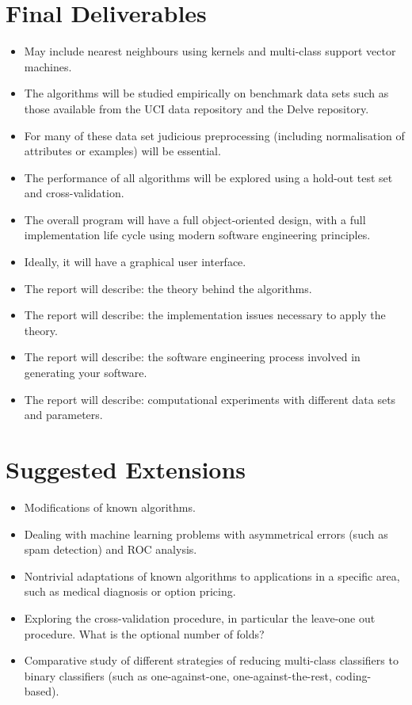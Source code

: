 \documentclass[]{final_report}
\begin{document}
\section{Final Deliverables}
\begin{itemize}
  \item May include nearest neighbours using kernels and multi-class support vector machines.
  \item The algorithms will be studied empirically on benchmark data sets such as those available from the UCI data repository and the Delve repository.
  \item For many of these data set judicious preprocessing (including normalisation of attributes or examples) will be essential.
  \item The performance of all algorithms will be explored using a hold-out test set and cross-validation.
  \item The overall program will have a full object-oriented design, with a full implementation life cycle using modern software engineering principles.
  \item Ideally, it will have a graphical user interface.
  \item The report will describe: the theory behind the algorithms.
  \item The report will describe: the implementation issues necessary to apply the theory.
  \item The report will describe: the software engineering process involved in generating your software.
  \item The report will describe: computational experiments with different data sets and parameters.
\end{itemize}

\section{Suggested Extensions}
\begin{itemize}
\item Modifications of known algorithms.
\item Dealing with machine learning problems with asymmetrical errors (such as spam detection) and ROC analysis.
\item Nontrivial adaptations of known algorithms to applications in a specific area, such as medical diagnosis or option pricing.
\item Exploring the cross-validation procedure, in particular the leave-one out procedure. What is the optional number of folds?
\item Comparative study of different strategies of reducing multi-class classifiers to binary classifiers (such as one-against-one, one-against-the-rest, coding-based).
\end{itemize}
\end{document}
